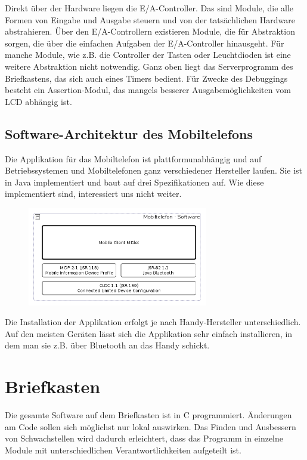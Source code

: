 \documentclass[ngerman]{article}
\begin{document}
Direkt über der Hardware liegen die E/A-Controller. Das sind Module, die alle
Formen von Eingabe und Ausgabe steuern und von der tatsächlichen Hardware
abstrahieren. Über den E/A-Controllern existieren Module, die für Abstraktion
sorgen, die über die einfachen Aufgaben der E/A-Controller hinausgeht. Für
manche Module, wie z.B. die Controller der Tasten oder Leuchtdioden ist eine
weitere Abstraktion nicht notwendig. Ganz oben liegt das Serverprogramm des
Briefkastens, das sich auch eines Timers bedient. Für Zwecke des Debuggings
besteht ein Assertion-Modul, das mangels besserer Ausgabemöglichkeiten vom LCD
abhängig ist.


\subsection{Software-Architektur des Mobiltelefons}

Die Applikation für das Mobiltelefon ist plattformunabhängig und auf
Betriebssystemen und Mobiltelefonen ganz verschiedener Hersteller laufen. Sie
ist in Java implementiert und baut auf drei Spezifikationen auf. Wie diese
implementiert sind, interessiert uns nicht weiter.

\begin{figure}[h!] \begin{center}
    \includegraphics[width=0.7\textwidth]{media/mobile-client-arch}
\end{center} \end{figure}

Die Installation der Applikation erfolgt je nach Handy-Hersteller
unterschiedlich. Auf den meisten Geräten lässt sich die Applikation sehr
einfach installieren, in dem man sie z.B. über Bluetooth an das Handy schickt.


\section{Briefkasten}

Die gesamte Software auf dem Briefkasten ist in C programmiert. Änderungen am
Code sollen sich möglichst nur lokal auswirken. Das Finden und Ausbessern von
Schwachstellen wird dadurch erleichtert, dass das Programm in einzelne Module
mit unterschiedlichen Verantwortlichkeiten aufgeteilt ist.
\end{document}
